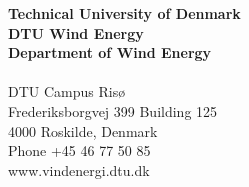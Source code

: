 \thispagestyle{empty} %
\frieze
\vspace*{\fill}
\noindent
\sffamily
\small
\textbf{Technical University of Denmark}\\
\textbf{DTU Wind Energy}\\
\textbf{Department of Wind Energy}\\
\\
DTU Campus Ris{\o}\\
Frederiksborgvej 399
Building 125\\
4000 Roskilde, Denmark\\
Phone +45 46 77 50 85\\
www.vindenergi.dtu.dk\\
\normalsize
\normalfont
\vspace*{2.5cm}
